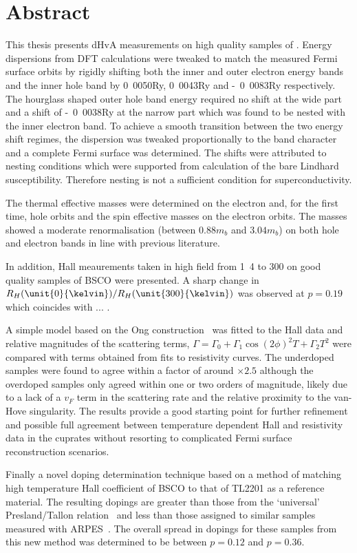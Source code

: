 \cleardoublepage

\section*{Abstract}

This thesis presents \ac{dHvA} measurements on high quality samples of \BaFeP. Energy dispersions from \ac{DFT} calculations were tweaked to match the measured Fermi surface orbits by rigidly shifting both the inner and outer electron energy bands and the inner hole band by \unit{0.0050}{\textrm{Ry}}, \unit{0.0043}{\textrm{Ry}} and \unit{-0.0083}{\textrm{Ry}} respectively. The hourglass shaped outer hole band energy required no shift at the wide part and a shift of \unit{-0.0038}{\textrm{Ry}} at the narrow part which was found to be nested with the inner electron band. To achieve a smooth transition between the two energy shift regimes, the dispersion was tweaked proportionally to the \DzTwo band character and a complete Fermi surface was determined. The shifts were attributed to nesting conditions which were supported from calculation of the bare Lindhard susceptibility. Therefore nesting is not a sufficient condition for superconductivity.

The thermal effective masses were determined on the electron and, for the first time, hole orbits and the spin effective masses on the electron orbits. The masses showed a moderate renormalisation (between $\unit{0.88}{m_b}$ and $\unit{3.04}{m_b}$) on both hole and electron bands in line with previous literature.

In addition, Hall meaurements taken in high field from \unit{1.4}{\kelvin} to \unit{300}{\kelvin} on good quality samples of \ac{BSCO} were presented. A sharp change in $R_H(\unit{0}{\kelvin})/R_H(\unit{300}{\kelvin})$ was observed at $p=0.19$ which coincides with ... .

A simple model based on the Ong construction~\cite{Ong1991} was fitted to the Hall data and relative magnitudes of the scattering terms, $\Gamma = \Gamma_0 + \Gamma_1 \cos(2\phi)^2 T + \Gamma_2 T^2$ were compared with terms obtained from fits to resistivity curves. The underdoped samples were found to agree within a factor of around $\times 2.5$ although the overdoped samples only agreed within one or two orders of magnitude, likely due to a lack of a $v_F$ term in the scattering rate and the relative proximity to the van-Hove singularity. The results provide a good starting point for further refinement and possible full agreement between temperature dependent Hall and resistivity data in the cuprates without resorting to complicated Fermi surface reconstruction scenarios.

Finally a novel doping determination technique based on a method of matching high temperature Hall coefficient of \ac{BSCO} to that of \ac{TL2201} as a reference material. The resulting dopings are greater than those from the `universal' Presland/Tallon relation~\cite{Presland1991} and less than those assigned to similar samples measured with \ac{ARPES}~\cite{Kondo2004}. The overall spread in dopings for these samples from this new method was determined to be between $p=0.12$ and $p=0.36$.

